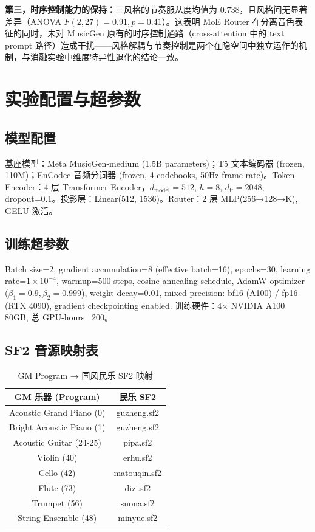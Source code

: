 \documentclass[conference]{IEEEtran}
\begin{document}
\textbf{第三，时序控制能力的保持：}三风格的节奏服从度均值为 0.738，且风格间无显著差异（ANOVA $F(2,27)=0.91, p=0.41$）。这表明 MoE Router 在分离音色表征的同时，未对 MusicGen 原有的时序控制通路（cross-attention 中的 text prompt 路径）造成干扰——风格解耦与节奏控制是两个在隐空间中独立运作的机制，与消融实验中维度特异性退化的结论一致。

\section{实验配置与超参数}

\subsection{模型配置}
基座模型：Meta MusicGen-medium (1.5B parameters)；T5 文本编码器 (frozen, 110M)；EnCodec 音频分词器 (frozen, 4 codebooks, 50Hz frame rate)。Token Encoder：4 层 Transformer Encoder，$d_{\text{model}}=512$, $h=8$, $d_{\text{ff}}=2048$, dropout=0.1。投影层：Linear(512, 1536)。Router：2 层 MLP(256→128→K), GELU 激活。

\subsection{训练超参数}
Batch size=2, gradient accumulation=8 (effective batch=16), epochs=30, learning rate=$1\times10^{-4}$, warmup=500 steps, cosine annealing schedule, AdamW optimizer ($\beta_1=0.9,\beta_2=0.999$), weight decay=0.01, mixed precision: bf16 (A100) / fp16 (RTX 4090), gradient checkpointing enabled. 训练硬件：4× NVIDIA A100 80GB, 总 GPU-hours ~200。

\subsection{SF2 音源映射表}
\begin{table}[htbp]
\centering\footnotesize
\caption{GM Program → 国风民乐 SF2 映射}
\begin{tabular}{c|c}
\toprule
GM 乐器 (Program) & 民乐 SF2 \\
\midrule
Acoustic Grand Piano (0) & guzheng.sf2 \\
Bright Acoustic Piano (1) & guzheng.sf2 \\
Acoustic Guitar (24-25) & pipa.sf2 \\
Violin (40) & erhu.sf2 \\
Cello (42) & matouqin.sf2 \\
Flute (73) & dizi.sf2 \\
Trumpet (56) & suona.sf2 \\
String Ensemble (48) & minyue.sf2 \\
\bottomrule
\end{tabular}
\end{table}
\end{document}
